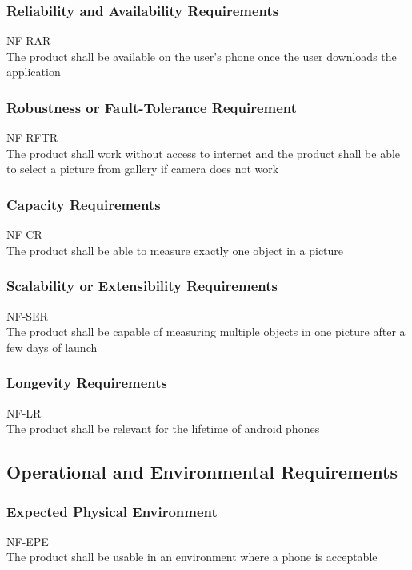 \documentclass[12pt, titlepage]{article}
\begin{document}
\subsubsection{Reliability and Availability Requirements}
NF-RAR \\
The product shall be available on the user’s phone once the user downloads the application 

\subsubsection{Robustness or Fault-Tolerance Requirement}
NF-RFTR \\
The product shall work without access to internet and the product shall be able to select a picture from gallery if camera does not work

\subsubsection{Capacity Requirements}
NF-CR \\
The product shall be able to measure exactly one object in a picture 

\subsubsection{Scalability or Extensibility Requirements}
NF-SER \\
The product shall be capable of measuring multiple objects in one picture after a few days of launch

\subsubsection{Longevity Requirements}
NF-LR \\
The product shall be relevant for the lifetime of android phones


\subsection{Operational and Environmental Requirements}

\subsubsection{Expected Physical Environment}
NF-EPE \\
The product shall be usable in an environment where a phone is acceptable 
\end{document}
